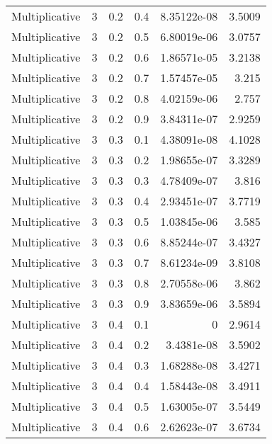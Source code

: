 \documentclass{article}
\begin{document}
\begin{longtable}[H]{lrrrrr}
 Multiplicative &       3 &   0.2 &            0.4 &   8.35122e-08 &          3.5009 \\
 Multiplicative &       3 &   0.2 &            0.5 &   6.80019e-06 &          3.0757 \\
 Multiplicative &       3 &   0.2 &            0.6 &   1.86571e-05 &          3.2138 \\
 Multiplicative &       3 &   0.2 &            0.7 &   1.57457e-05 &          3.215  \\
 Multiplicative &       3 &   0.2 &            0.8 &   4.02159e-06 &          2.757  \\
 Multiplicative &       3 &   0.2 &            0.9 &   3.84311e-07 &          2.9259 \\
 Multiplicative &       3 &   0.3 &            0.1 &   4.38091e-08 &          4.1028 \\
 Multiplicative &       3 &   0.3 &            0.2 &   1.98655e-07 &          3.3289 \\
 Multiplicative &       3 &   0.3 &            0.3 &   4.78409e-07 &          3.816  \\
 Multiplicative &       3 &   0.3 &            0.4 &   2.93451e-07 &          3.7719 \\
 Multiplicative &       3 &   0.3 &            0.5 &   1.03845e-06 &          3.585  \\
 Multiplicative &       3 &   0.3 &            0.6 &   8.85244e-07 &          3.4327 \\
 Multiplicative &       3 &   0.3 &            0.7 &   8.61234e-09 &          3.8108 \\
 Multiplicative &       3 &   0.3 &            0.8 &   2.70558e-06 &          3.862  \\
 Multiplicative &       3 &   0.3 &            0.9 &   3.83659e-06 &          3.5894 \\
 Multiplicative &       3 &   0.4 &            0.1 &   0           &          2.9614 \\
 Multiplicative &       3 &   0.4 &            0.2 &   3.4381e-08  &          3.5902 \\
 Multiplicative &       3 &   0.4 &            0.3 &   1.68288e-08 &          3.4271 \\
 Multiplicative &       3 &   0.4 &            0.4 &   1.58443e-08 &          3.4911 \\
 Multiplicative &       3 &   0.4 &            0.5 &   1.63005e-07 &          3.5449 \\
 Multiplicative &       3 &   0.4 &            0.6 &   2.62623e-07 &          3.6734 \\

\end{longtable}
\end{document}
